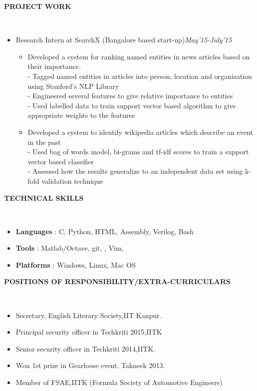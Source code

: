 \documentclass[a4paper,10pt]{article}
\newcommand{\isep}{-2 pt}
\newcommand{\lsep}{-0.5cm}
\newcommand{\resheading}[1]{{\small \colorbox{mygrey}{\begin{minipage}{0.975\textwidth}{\textbf{#1 \vphantom{p\^{E}}}}\end{minipage}}}}
\begin{document}
\resheading{\textbf{PROJECT WORK} }\\[\lsep]
\begin{itemize}
\item\noindent Research Intern at SearchX (Bangalore based start-up)\hfill\emph{May'15-July'15}
\vspace{-2mm}
\begin{itemize}\itemsep \isep
\item \noindent Developed a system for ranking named entities in news articles based on their importance.\\
- Tagged named entities in articles into person, location and organization using Stanford's NLP Library\\
- Engineered several features to give relative importance to entities\\
- Used labelled data to train support vector based algorithm to give appropriate weights to the features\\\vspace{-4mm}
\item \noindent Developed a system to identify wikipedia articles which describe an event in the past\\
- Used bag of words model, bi-grams and tf-idf scores to train a support vector based classifier\\
- Assessed how the results generalize to an independent data set using k-fold validation technique
\end{itemize}
\end{itemize}

\resheading{\textbf{TECHNICAL SKILLS} }\\[\lsep]
\begin{itemize}\itemsep\isep
\item \noindent \textbf{Languages} : C, Python, HTML, Assembly, Verilog, Bash
\item \noindent \textbf{Tools} : Matlab/Octave, git, \latex, Vim,
\item \noindent \textbf{Platforms} : Windows, Linux, Mac OS
\end{itemize}

\resheading{\textbf{POSITIONS OF RESPONSIBILITY/EXTRA-CURRICULARS} }\\[\lsep]
\begin{itemize}\itemsep \isep
\item \noindent Secretary, English Literary Society,IIT Kanpur.
\item \noindent Principal security officer in Techkriti 2015,IITK
\item \noindent Senior security officer in Techkriti 2014,IITK.
\item \noindent Won 1st prize in Gearloose event, Takneek 2013.
\item \noindent Member of FSAE,IITK (Formula Society of Automotive Engineers)
\end{itemize}
\end{document}
